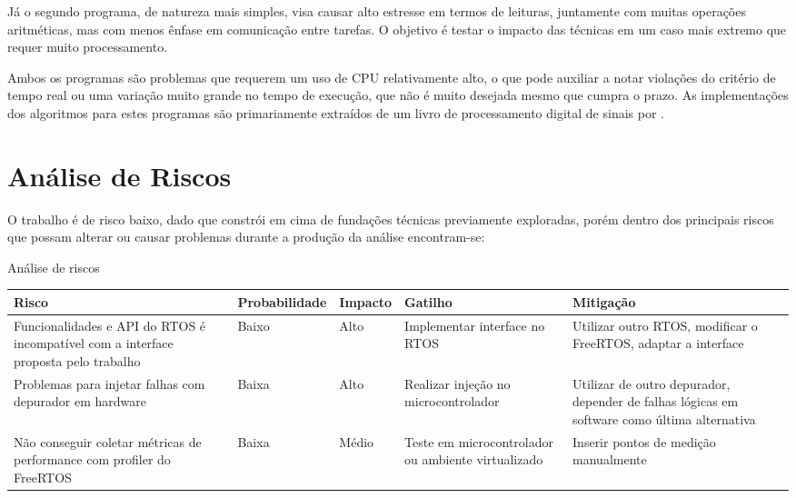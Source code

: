 Já o segundo programa, de natureza mais simples, visa causar alto estresse em termos de leituras, juntamente com muitas operações aritméticas, mas com menos ênfase em comunicação entre tarefas. O objetivo é testar o impacto das técnicas em um caso mais extremo que requer muito processamento.

Ambos os programas são problemas que requerem um uso de CPU relativamente alto, o que pode auxiliar a notar violações do critério de tempo real ou uma variação muito grande no tempo de execução, que não é muito desejada mesmo que cumpra o prazo. As implementações dos algoritmos para estes programas são primariamente extraídos de um livro de processamento digital de sinais por .

\section{Análise de Riscos} \label{sec:analiseRiscos}

O trabalho é de risco baixo, dado que constrói em cima de fundações técnicas previamente exploradas, porém dentro dos principais riscos que possam alterar ou causar problemas durante a produção da análise encontram-se:

\begin{quadro}[H]
    \centering
    \caption{Análise de riscos}
    \begin{tabular}{|p{}|p{}|p{}|p{}|p{}|}
        \hline
        \rowcolor[HTML]{C0C0C0}
        \textbf{Risco} & \textbf{Probabilidade} & \textbf{Impacto} & \textbf{Gatilho} & \textbf{Mitigação} \\
        \hline

        Funcionalidades e API do RTOS é incompatível com a interface proposta pelo trabalho &  Baixo & Alto & Implementar interface no RTOS & Utilizar outro RTOS, modificar o FreeRTOS, adaptar a interface \\
        \hline

        Problemas para injetar falhas com depurador em hardware & Baixa & Alto & Realizar injeção no microcontrolador & Utilizar de outro depurador, depender de falhas lógicas em software como última alternativa \\
        \hline

        Não conseguir coletar métricas de performance com profiler do FreeRTOS & Baixa & Médio & Teste em microcontrolador ou ambiente virtualizado & Inserir pontos de medição manualmente \\
        \hline
    \end{tabular}
    \label{tab:riscos}
\end{quadro}

